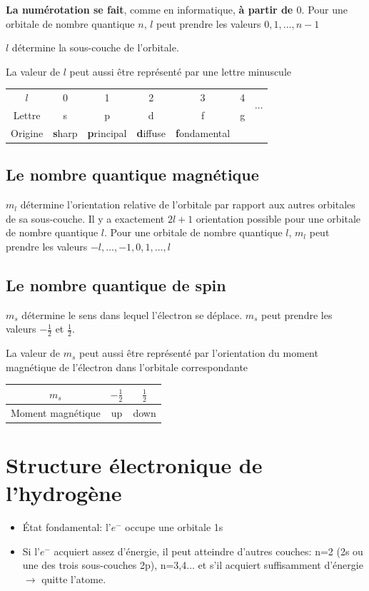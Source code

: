 \documentclass[11pt,a4paper,french]{article}
\begin{document}
{\bf La numérotation se fait}, comme en informatique, {\bf à partir de $0$}.
Pour une orbitale de nombre quantique $n$, $l$ peut prendre les valeurs $0, 1, \ldots, n-1$

$l$ détermine la sous-couche de l'orbitale.

La valeur de $l$ peut aussi être représenté par une lettre minuscule

\begin{center}
	\begin{tabular}{c|cccccc}
		$l$ & 0 & 1 & 2 & 3 & 4 & \multirow{2}{*}{$\cdots$}\\
		\cline{1-6}
		Lettre & s & p & d & f & g\\
		Origine & {\bf s}harp & {\bf p}rincipal & {\bf d}iffuse & {\bf f}ondamental
	\end{tabular}
\end{center}

\subsection{Le nombre quantique magnétique}
$m_l$ détermine l'orientation relative de l'orbitale par rapport aux autres orbitales de sa sous-couche.
Il y a exactement $2l + 1$ orientation possible pour une orbitale de nombre quantique $l$.
Pour une orbitale de nombre quantique $l$, $m_l$ peut prendre les valeurs $-l, \ldots, -1,  0, 1, \ldots, l$

\subsection{Le nombre quantique de spin}
$m_s$ détermine le sens dans lequel l'électron se déplace.
$m_s$ peut prendre les valeurs $-\frac{1}{2}$ et $\frac{1}{2}$.

La valeur de $m_s$ peut aussi être représenté par l'orientation du moment magnétique de l'électron dans l'orbitale correspondante

\begin{center}
	\begin{tabular}{c|cc}
		$m_s$ & $-\frac{1}{2}$ & $\frac{1}{2}$\\
		\hline
		Moment magnétique & up & down
	\end{tabular}
\end{center}


\section{Structure électronique de l'hydrogène}
\begin{itemize}
	\item \'Etat fondamental: l'$e^-$ occupe une orbitale 1s
	\item Si l'$e^-$ acquiert assez d'énergie, il peut atteindre d'autres couches: n=2 (2s ou une des trois sous-couches 2p), n=3,4... et s'il acquiert suffisamment d'énergie $\rightarrow$ quitte l'atome.
\end{itemize}
\end{document}
